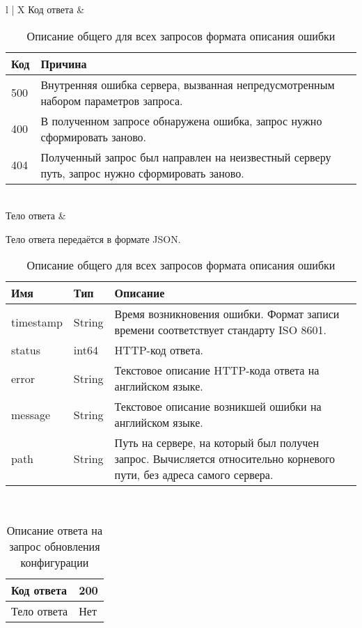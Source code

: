 \begin{table}[hbtp]
    \caption{Описание общего для всех запросов формата описания ошибки}
    \begin{tabularx}{\textwidth}{l | X}
        Код ответа & {
            \begin{tabularx}{\linewidth}{l | X}
                \textbf{Код} & \textbf{Причина} \\
                \hline
                500 & Внутренняя ошибка сервера, вызванная непредусмотренным набором параметров запроса. \\
                \hline
                400 & В полученном запросе обнаружена ошибка, запрос нужно сформировать заново. \\
                \hline
                404 & Полученный запрос был направлен на неизвестный серверу путь, запрос нужно сформировать заново. \\
            \end{tabularx}
        } \\
        \hline
        Тело ответа & {
            Тело ответа передаётся в формате JSON.
            \begin{tabularx}{\linewidth}{l l X}
                \textbf{Имя} & \textbf{Тип} & \textbf{Описание} \\
                \hline
                timestamp & String & Время возникновения ошибки. Формат записи времени соответствует стандарту ISO 8601. \\
                \hline
                status & int64 & HTTP-код ответа. \\
                \hline
                error & String & Текстовое описание HTTP-кода ответа на английском языке. \\
                \hline
                message & String & Текстовое описание возникшей ошибки на английском языке. \\
                \hline
                path & String & Путь на сервере, на который был получен запрос. Вычисляется относительно корневого пути, без адреса самого сервера. \\
            \end{tabularx}
        } \\
    \end{tabularx}
    \label{general-error}
\end{table}
\begin{table}[hbtp]
    \caption{Описание ответа на запрос обновления конфигурации}
    \begin{tabularx}{\textwidth}{p{} | X}
        Код ответа & 200 \\
        \hline
        Тело ответа & Нет \\
    \end{tabularx}
    \label{update-response}
\end{table}


